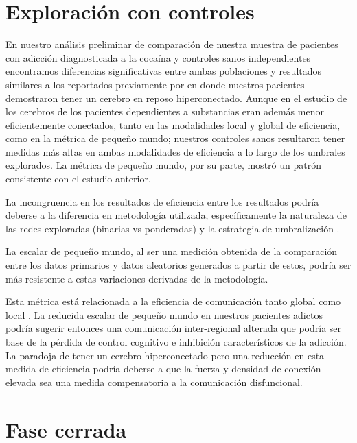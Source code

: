 \section{Exploración con controles}
En nuestro análisis preliminar de comparación de nuestra muestra de pacientes con adicción diagnosticada a la cocaína y controles sanos independientes encontramos diferencias significativas entre ambas poblaciones y resultados similares a los reportados previamente por \textcite{Wang2015a} en donde nuestros pacientes demostraron tener un cerebro en reposo hiperconectado. Aunque en el estudio de \textcite{Wang2015a} los cerebros de los pacientes dependientes a substancias eran además menor eficientemente conectados, tanto en las modalidades local y global de eficiencia, como en la métrica de pequeño mundo; nuestros controles sanos resultaron tener medidas más altas en ambas modalidades de eficiencia a lo largo de los umbrales explorados. La métrica de pequeño mundo, por su parte, mostró un patrón consistente con el estudio anterior. \par
La incongruencia en los resultados de eficiencia entre los resultados podría deberse a la diferencia en metodología utilizada, específicamente la naturaleza de las redes exploradas (binarias vs ponderadas) y la estrategia de umbralización \parencite{Hallquist2018}. \par
La escalar de pequeño mundo, al ser una medición obtenida de la comparación entre los datos primarios y datos aleatorios generados a partir de estos, podría ser más resistente a estas variaciones derivadas de la metodología. \par
Esta métrica está relacionada a la eficiencia de comunicación tanto global como local \parencite{Latora2001}. La reducida escalar de pequeño mundo en nuestros pacientes adictos podría sugerir entonces una comunicación inter-regional alterada que podría ser base de la pérdida de control cognitivo e inhibición característicos de la adicción. La paradoja de tener un cerebro hiperconectado pero una reducción en esta medida de eficiencia podría deberse a que la fuerza y densidad de conexión elevada sea una medida compensatoria a la comunicación disfuncional.

\section{Fase cerrada}
